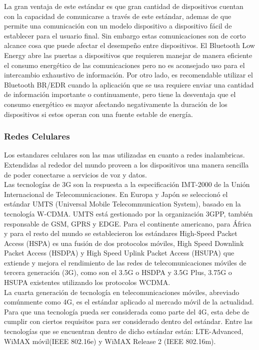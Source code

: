 La gran ventaja de este estándar es que gran cantidad de dispositivos cuentan con la capacidad de comunicarse a través de este estándar, ademas de que permite una comunicación con un modelo dispositivo a dispositivo fácil de establecer para el usuario final. Sin embargo estas comunicaciones son de corto alcance cosa que puede afectar el desempeño entre dispositivos. El Bluetooth Low Energy abre las puertas a dispositivos que requieren manejar de manera eficiente el consumo energético de las comunicaciones pero no es aconsejado uso para el intercambio exhaustivo de información. Por otro lado, es recomendable utilizar el Bluetooth BR/EDR cuando la aplicación que se usa requiere enviar una cantidad de información importante o continuamente, pero tiene la desventaja que el consumo energético es mayor afectando negativamente la duración de los dispositivos si estos operan con una fuente estable de energía.
\subsubsection{Redes Celulares}
Los estandares celulares son las mas utilizadas en cuanto a redes inalambricas. Extendidas al rededor del mundo proveen a los dispositivos una manera sencilla de poder conectarse a servicios de voz y datos. \\

Las tecnologías de 3G son la respuesta a la especificación IMT-2000 de la Unión Internacional de Telecomunicaciones\cite{itu2000}. En Europa y Japón se seleccionó el estándar UMTS (Universal Mobile Telecommunication System)\cite{umts}, basado en la tecnología W-CDMA\cite{wcdma}. UMTS está gestionado por la organización 3GPP, también responsable de GSM, GPRS y EDGE. Para el continente americano, para África y para el resto del mundo se establecieron los estándares High-Speed Packet Access (HSPA)\cite{hspa} es una fusión de dos protocolos móviles, High Speed Downlink Packet Access (HSDPA)\cite{hspa} y High Speed Uplink Packet Access (HSUPA)\cite{hspa} que extiende y mejora el rendimiento de las redes de telecomunicaciones móviles de tercera generación (3G), como son el 3.5G o HSDPA y 3.5G Plus, 3.75G o HSUPA existentes utilizando los protocolos WCDMA.\\

La cuarta generación de tecnología en telecomunicaciones móviles, abreviado comúnmente como 4G, es el estándar aplicado al mercado móvil de la actualidad. Para que una tecnología pueda ser considerada como parte del 4G, esta debe de cumplir con ciertos requisitos para ser considerado dentro del estándar. Entre las tecnologías que se encuentran dentro de dicho estándar están: LTE-Advanced\cite{LTE-advanced}, WiMAX móvil(IEEE 802.16e)\cite{ieee80216} y WiMAX Release 2 (IEEE 802.16m).\cite{ieee80216}\\

